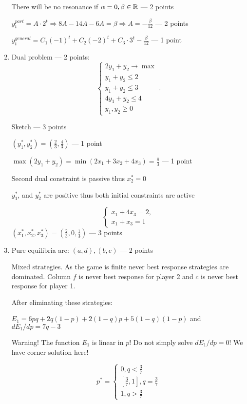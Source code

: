 \begin{enumerate}
    There will be no resonance if $\alpha = 0, \beta \in \mathbb{R}$ — 2 points

    $y_t^{part}=A\cdot 2^t\Rightarrow 8A-14A-6A=\beta\Rightarrow A=-\frac{\beta}{12}$ — 2 points

    $y_t^{general}=C_1(-1)^t+C_2(-2)^t+C_3\cdot 3^t-\frac{\beta}{12}$ — 1 point

    \item Dual problem — 2 points: 
    \[
          \begin{cases}
          2y_1+y_2 \to \max \\
          y_1+y_2 \leq 2 \\
          y_1+y_2\leq 3 \\
          4y_1+y_2 \leq 4 \\
          y_1,y_2\geq 0
          \end{cases}.
    \]

    Sketch — 3 points
    
    $(y_1^{*},y_2^{*})=\left( \frac{2}{3},\frac{4}{3}\right)$ — 1 point

    $\max(2y_1+y_2)=\min(2x_1 + 3x_2 + 4x_3)=\frac{8}{3}$ — 1 point

    Second dual constraint is passive thus $x_2^{*}=0$

    $y_1^{*}$, and $y_2^{*}$ are positive thus  both initial constraints are active
    
    \[
    \begin{cases}
        x_1  + 4x_3 = 2, \\
        x_1 +  x_3 = 1 
    \end{cases}
\]
    $(x_1^{*},x_2^{*},x_3^{*})=\left( \frac{2}{3},0,\frac{1}{3}\right)$ — 3 points

    \item Pure equilibria are: $(a,d),(b,e)$ — 2 points

    Mixed strategies. As the game is finite  never best response strategies are dominated. 
    Column $f$ is never best response for player 2 and $c$ is never best response for player 1.
    
    After eliminating these strategies:

    $E_1=6pq+2q(1-p)+2(1-q)p+5(1-q)(1-p)$ and $dE_1/dp=7q-3$

    Warning! The function $E_1$ is linear in $p$! Do not simply solve $dE_1/dp=0$! 
    We have corner solution here!

    \[
      p^*=\begin{cases}
        0, q<\frac{3}{7} \\
        \left[ \frac{3}{7},1 \right], q=\frac{3}{7} \\
        1, q>\frac{3}{7}
    \end{cases}
    \]


\end{enumerate}
